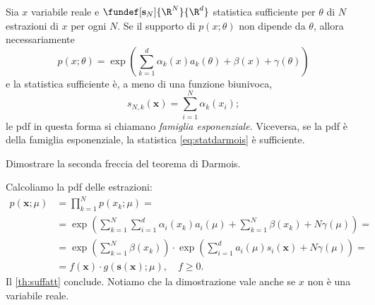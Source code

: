 \begin{fact}
	\label{th:darmois}
	Sia $x$ variabile reale e $\fundef[\mathbf s_N]{\R^N}{\R^d}$ statistica sufficiente per $\theta$ di $N$ estrazioni di $x$ per ogni $N$.
	Se il supporto di $p(x;\theta)$ non dipende da $\theta$, allora necessariamente
	\begin{equation*}
		p(x;\theta) =
		\exp \left( \sum_{k=1}^d \alpha_k(x)a_k(\theta) + \beta(x) + \gamma(\theta) \right)
	\end{equation*}
	e la statistica sufficiente è, a meno di una funzione biunivoca,
	\begin{equation}
		\label{eq:statdarmois}
		s_{N,k}(\mathbf x) = \sum_{i=1}^{N} \alpha_k(x_i);
	\end{equation}
	le pdf in questa forma si chiamano \emph{famiglia esponenziale}.
	Viceversa, se la pdf è della famiglia esponenziale, la statistica \eqref{eq:statdarmois} è sufficiente.
\end{fact}

\begin{exercise}
	Dimostrare la seconda freccia del teorema di Darmois.
\end{exercise}

\begin{solution}
	Calcoliamo la pdf delle estrazioni:
	\begin{align*}
		p(\mathbf x;\mu)
		&= \prod_{k=1}^N p(x_k;\mu) = \\
		&= \exp \left( \sum_{k=1}^N \sum_{i=1}^d \alpha_i(x_k)a_i(\mu)
		+ \sum_{k=1}^N \beta(x_k) + N\gamma(\mu) \right) = \\
		&= \exp \left( \sum_{k=1}^N \beta(x_k) \right)
		\cdot \exp \left( \sum_{i=1}^d a_i(\mu)s_i(\mathbf x) + N\gamma(\mu) \right) = \\
		&= f(\mathbf x) \cdot g(\mathbf s(\mathbf x);\mu), \quad f\ge0.
	\end{align*}
	Il \autoref{th:suffatt} conclude.
	Notiamo che la dimostrazione vale anche se $x$ non è una variabile reale.
\end{solution}
